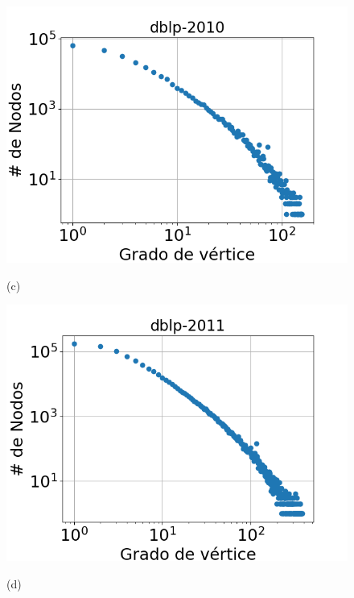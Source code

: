 \begin{figure}[p]
    	\begin{minipage}{1\textwidth}
    		\centering
    		\begin{minipage}{0.45\textwidth}
    			\centering
    			\includegraphics[width=1\linewidth]{img/grades/dblp-2010.png}
    			
    			(c)
    		\end{minipage}
    		\begin{minipage}{0.45\textwidth}
    			\centering
    			\includegraphics[width=1\linewidth]{img/grades/dblp-2011.png}
    			
    			(d)
    		\end{minipage}  
    	\end{minipage}
    	

\end{figure}
